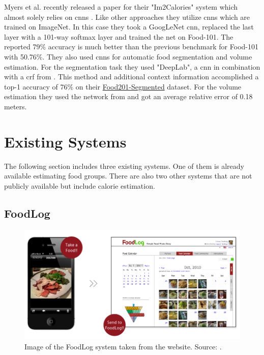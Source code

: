 Myers et al. recently released a paper for their "Im2Calories" system which almost solely relies on \glspl{cnn} \cite{Meyers2015}. Like other approaches they utilize \glspl{cnn} which are trained on ImageNet. In this case they took a GoogLeNet \gls{cnn}, replaced the last layer with a 101-way softmax layer and trained the net on Food-101. The reported 79\% accuracy is much better than the previous benchmark for Food-101 with 50.76\%. They also used \glspl{cnn} for automatic food segmentation and volume estimation. For the segmentation task they used "DeepLab", a \gls{cnn} in combination with a \gls{crf} from \cite{Chen2014}. This method and additional context information accomplished a top-1 accuracy of 76\% on their \hyperref[subsec:relWork_Datasets_food201]{Food201-Segmented} dataset. For the volume estimation they used the network from \cite{Eigen2015} and got an average relative error of 0.18 meters.


\section{Existing Systems}
\label{sec:relWork_exSystems}
The following section includes three existing systems. One of them is already available estimating food groups. There are also two other systems that are not publicly available but include calorie estimation.

\subsection{FoodLog}
\begin{figure}[htbp]
	\includegraphics[width=\linewidth]{data/images/relWork/foodLog_screenshot}
	\caption{Image of the FoodLog system taken from the website. Source: \cite{Inc.}.}
	\label{fig:foodLogScreenshot}
\end{figure}

